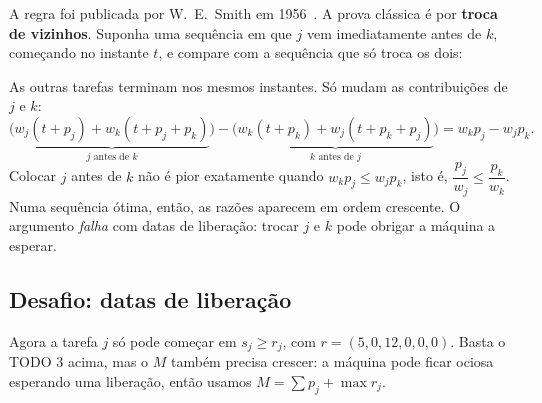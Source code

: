 \begin{outros}
A regra foi publicada por W.~E.~Smith em 1956~\cite{smith1956}. A prova clássica é por \textbf{troca de vizinhos}.
Suponha uma sequência em que $j$ vem imediatamente antes de $k$, começando no instante $t$, e compare com a sequência
que só troca os dois:
\begin{center}
\end{center}
As outras tarefas terminam nos mesmos instantes. Só mudam as contribuições de $j$ e $k$:
\[
\Big(\underbrace{w_j(t+p_j)+w_k(t+p_j+p_k)}_{j\text{ antes de }k}\Big) - \Big(\underbrace{w_k(t+p_k)+w_j(t+p_k+p_j)}_{k\text{ antes de }j}\Big)
= w_kp_j - w_jp_k .
\]
Colocar $j$ antes de $k$ não é pior exatamente quando $w_kp_j\le w_jp_k$, isto é,
$\dfrac{p_j}{w_j}\le\dfrac{p_k}{w_k}$. Numa sequência ótima, então, as razões aparecem em ordem crescente.
O argumento \emph{falha} com datas de liberação: trocar $j$ e $k$ pode obrigar a máquina a esperar.
\end{outros}

\subsection*{Desafio: datas de liberação}

Agora a tarefa $j$ só pode começar em $s_j\ge r_j$, com $r=(5,0,12,0,0,0)$. Basta o TODO 3 acima, mas o $M$ também
precisa crescer: a máquina pode ficar ociosa esperando uma liberação, então usamos $M=\sum p_j+\max r_j$.

